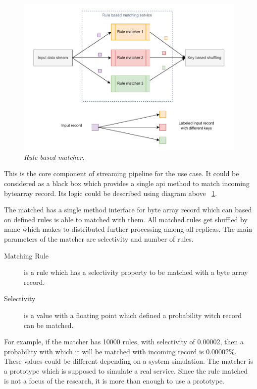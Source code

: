 \begin{figure}[H]
    \centering
    \includegraphics[width=1\textwidth]{figures/rule-matcher}
    \caption{\textit{Rule based matcher.}}
    \label{fig:rule-matcher}
\end{figure}

This is the core component of streaming pipeline for the use case.
It could be considered as a black box which provides a single api method to match
incoming bytearray record.
Its logic could be described using diagram above ~\ref{fig:rule-matcher}.

The matched has a single method interface for byte array record which
can based on defined rules is able to matched with them.
All matched rules get shuffled by name which makes to distributed
further processing among all replicas.
The main parameters of the matcher are selectivity and number of rules.

\begin{description}
    \item[Matching Rule] is a rule which has a selectivity property to be matched with a byte array record.
    \item[Selectivity] is a value with a floating point which defined a probability witch record can be
    matched.
\end{description}

For example, if the matcher has 10000 rules, with selectivity of 0.00002, then a probability with
which it will be matched with incoming record is 0.00002\%.
These values could be different depending on a system simulation.
The matcher is a prototype which is supposed to simulate a real service.
Since the rule matched is not a focus of the research, it is more than enough to use
a prototype.

